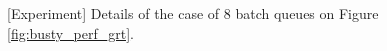 \begin{figure}[!t]
	\centering
	\\
	\\
	\caption{[Experiment] Details of the case of 8 batch queues on Figure \ref{fig:busty_perf_grt}. }
	\label{fig:busty_perf_grt_details8}
\end{figure}
